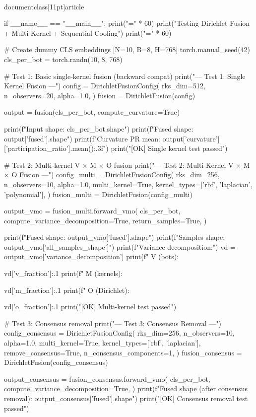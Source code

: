 \\documentclass[11pt]{article}
\begin{document}
\begin{CodeBlock}
{{{{{{{{{{if __name__ == "__main__":
    print("=" * 60)
    print("Testing Dirichlet Fusion + Multi-Kernel + Sequential Cooling")
    print("=" * 60)
    
    # Create dummy CLS embeddings [N=10, B=8, H=768]
    torch.manual_seed(42)
    cls_per_bot = torch.randn(10, 8, 768)
    
    # Test 1: Basic single-kernel fusion (backward compat)
    print("\n--- Test 1: Single Kernel Fusion ---")
    config = DirichletFusionConfig(
        rks_dim=512,
        n_observers=20,
        alpha=1.0,
    )
    fusion = DirichletFusion(config)
    
    output = fusion(cls_per_bot, compute_curvature=True)
    
    print(f"Input shape: {cls_per_bot.shape}")
    print(f"Fused shape: {output['fused'].shape}")
    print(f"Curvature PR mean: {output['curvature']['participation_ratio'].mean():.3f}")
    print("[OK] Single kernel test passed")
    
    # Test 2: Multi-kernel V × M × O fusion
    print("\n--- Test 2: Multi-Kernel V × M × O Fusion ---")
    config_multi = DirichletFusionConfig(
        rks_dim=256,
        n_observers=10,
        alpha=1.0,
        multi_kernel=True,
        kernel_types=['rbf', 'laplacian', 'polynomial'],
    )
    fusion_multi = DirichletFusion(config_multi)
    
    output_vmo = fusion_multi.forward_vmo(
        cls_per_bot,
        compute_variance_decomposition=True,
        return_samples=True,
    )
    
    print(f"Fused shape: {output_vmo['fused'].shape}")
    print(f"Samples shape: {output_vmo['all_samples_shape']}")
    print(f"Variance decomposition:")
    vd = output_vmo['variance_decomposition']
    print(f"  V (bots): {vd['v_fraction']:.1%
    print(f"  M (kernels): {vd['m_fraction']:.1%
    print(f"  O (Dirichlet): {vd['o_fraction']:.1%
    print("[OK] Multi-kernel test passed")
    
    # Test 3: Consensus removal
    print("\n--- Test 3: Consensus Removal ---")
    config_consensus = DirichletFusionConfig(
        rks_dim=256,
        n_observers=10,
        alpha=1.0,
        multi_kernel=True,
        kernel_types=['rbf', 'laplacian'],
        remove_consensus=True,
        n_consensus_components=1,
    )
    fusion_consensus = DirichletFusion(config_consensus)
    
    output_consensus = fusion_consensus.forward_vmo(
        cls_per_bot,
        compute_variance_decomposition=True,
    )
    print(f"Fused shape (after consensus removal): {output_consensus['fused'].shape}")
    print("[OK] Consensus removal test passed")
    
}}}}}}}}}}}}}
\end{CodeBlock}
\end{document}
